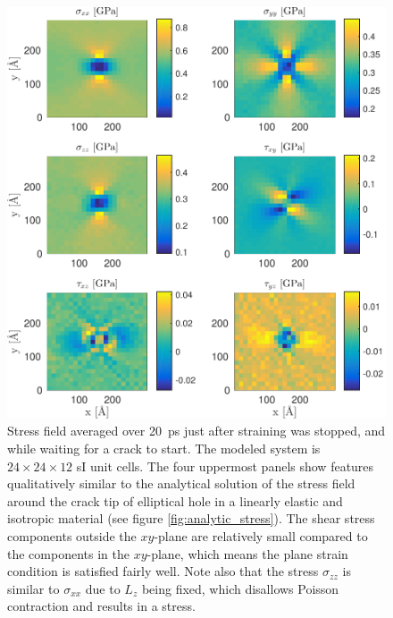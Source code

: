\begin{figure}
\centering
\includegraphics[width=\textwidth]{../figures/thesis/stressfield_avg_wait_for_crack.pdf}
\caption{Stress field averaged over \SI{20}{\pico\second} just after straining was stopped, and while waiting for a crack to start. The modeled system is $24\times 24\times 12$ sI unit cells. The four uppermost panels show features qualitatively similar to the analytical solution of the stress field around the crack tip of elliptical hole in a linearly elastic and isotropic material (see figure \ref{fig:analytic_stress}). The shear stress components outside the $xy$-plane are relatively small compared to the components in the $xy$-plane, which means the plane strain condition is satisfied fairly well. Note also that the stress $\sigma_{zz}$ is similar to $\sigma_{xx}$ due to $L_z$ being fixed, which disallows Poisson contraction and results in a stress.}
\label{fig:stressfield_avg_wait_for_crack}
\end{figure}


